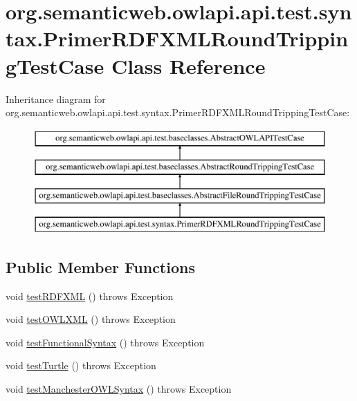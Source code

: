\hypertarget{classorg_1_1semanticweb_1_1owlapi_1_1api_1_1test_1_1syntax_1_1_primer_r_d_f_x_m_l_round_tripping_test_case}{\section{org.\-semanticweb.\-owlapi.\-api.\-test.\-syntax.\-Primer\-R\-D\-F\-X\-M\-L\-Round\-Tripping\-Test\-Case Class Reference}
\label{classorg_1_1semanticweb_1_1owlapi_1_1api_1_1test_1_1syntax_1_1_primer_r_d_f_x_m_l_round_tripping_test_case}
}
Inheritance diagram for org.\-semanticweb.\-owlapi.\-api.\-test.\-syntax.\-Primer\-R\-D\-F\-X\-M\-L\-Round\-Tripping\-Test\-Case\-:\begin{figure}[H]
\begin{center}
\leavevmode
\includegraphics[height=4.000000cm]{classorg_1_1semanticweb_1_1owlapi_1_1api_1_1test_1_1syntax_1_1_primer_r_d_f_x_m_l_round_tripping_test_case}
\end{center}
\end{figure}
\subsection*{Public Member Functions}
\begin{DoxyCompactItemize}
\item 
void \hyperlink{classorg_1_1semanticweb_1_1owlapi_1_1api_1_1test_1_1syntax_1_1_primer_r_d_f_x_m_l_round_tripping_test_case_aa6f8adc52c57ab70ece593dacf419680}{test\-R\-D\-F\-X\-M\-L} ()  throws Exception 
\item 
void \hyperlink{classorg_1_1semanticweb_1_1owlapi_1_1api_1_1test_1_1syntax_1_1_primer_r_d_f_x_m_l_round_tripping_test_case_a9e67d2ce43ef5c1d04879367e4572d68}{test\-O\-W\-L\-X\-M\-L} ()  throws Exception 
\item 
void \hyperlink{classorg_1_1semanticweb_1_1owlapi_1_1api_1_1test_1_1syntax_1_1_primer_r_d_f_x_m_l_round_tripping_test_case_ad4ef3fb2d1e8068fadc4484fec5f4db3}{test\-Functional\-Syntax} ()  throws Exception 
\item 
void \hyperlink{classorg_1_1semanticweb_1_1owlapi_1_1api_1_1test_1_1syntax_1_1_primer_r_d_f_x_m_l_round_tripping_test_case_aab44e65bb325d8030c131ee8c18e15f8}{test\-Turtle} ()  throws Exception 
\item 
void \hyperlink{classorg_1_1semanticweb_1_1owlapi_1_1api_1_1test_1_1syntax_1_1_primer_r_d_f_x_m_l_round_tripping_test_case_ab71391fc97b85c1c63eb9a02a656dfe0}{test\-Manchester\-O\-W\-L\-Syntax} ()  throws Exception 
\end{DoxyCompactItemize}
